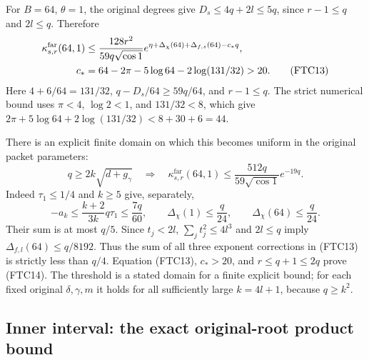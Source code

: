 \documentclass[11pt,a4paper]{article}
\begin{document}
For $B=64$, $\theta=1$, the original degrees give
$D_s\le4q+2l\le5q$, since $r-1\le q$ and $2l\le q$.
Therefore
\begin{align}
 \kappa_{s,r}^{\mathrm{far}}(64,1)
 &\le\frac{128r^2}{59q\sqrt{\cos1}}
 e^{\eta+\Delta_\chi(64)+\Delta_{f,s}(64)-c_*q},\notag\\
 c_*&=64-2\pi-5\log64-2\log(131/32)>20.
 \tag{FTC13}
\end{align}
Here $4+6/64=131/32$, $q-D_s/64\ge59q/64$, and $r-1\le q$.
The strict numerical bound uses $\pi<4$, $\log2<1$, and $131/32<8$,
which give $2\pi+5\log64+2\log(131/32)<8+30+6=44$.

There is an explicit finite domain on which this becomes uniform in
the original packet parameters:
\begin{equation}
 q\ge2k\sqrt{d+g_\gamma}
 \quad\Longrightarrow\quad
 \kappa_{s,r}^{\mathrm{far}}(64,1)
 \le\frac{512q}{59\sqrt{\cos1}}e^{-19q}.
 \tag{FTC14}
\end{equation}
Indeed $\tau_1\le1/4$ and $k\ge5$ give, separately,
\[
 -a_k\le\frac{k+2}{3k}q\tau_1\le\frac{7q}{60},\qquad
 \Delta_\chi(1)\le\frac q{24},\qquad
 \Delta_\chi(64)\le\frac q{24}.
\]
Their sum is at most $q/5$.  Since $t_j<2l$,
$\sum_jt_j^2\le4l^3$ and $2l\le q$ imply
$\Delta_{f,l}(64)\le q/8192$.  Thus the sum of all three exponent
corrections in (FTC13) is strictly less than $q/4$.
Equation (FTC13), $c_*>20$, and $r\le q+1\le2q$ prove (FTC14).
The threshold is a stated domain for a finite explicit bound; for each
fixed original $\delta,\gamma,m$ it holds for all sufficiently large
$k=4l+1$, because $q\ge k^2$.

\subsection{Inner interval: the exact original-root product bound}
\end{document}
